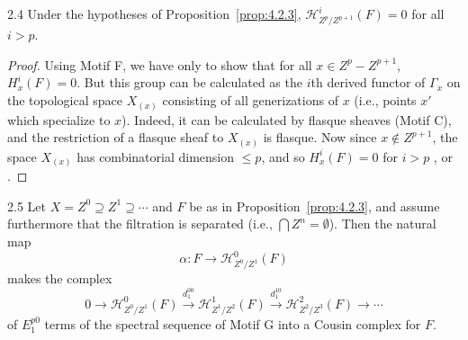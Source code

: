 \begin{booklemma}{2.4}\label{lem:4.2.4}
Under the hypotheses of Proposition~\ref{prop:4.2.3}, $\mathcal{H}_{Z^{p}/Z^{p+1}}^{i}(F)=0$ for all $i>p$.
\end{booklemma}

\begin{proof}
Using Motif F, we have only to show that for all $x\in Z^p-Z^{p+1}$, $H_x^{i}(F)=0$. But this group can be calculated as the $i$th derived functor of $\Gamma_x$ on the topological space $X_{(x)}$ consisting of all generizations of $x$ (i.e., points $x'$ which specialize to $x$). Indeed, it can be calculated by flasque sheaves (Motif C), and the restriction of a flasque sheaf to $X_{(x)}$ is flasque. Now since $x\notin Z^{p+1}$, the space $X_{(x)}$ has combinatorial dimension $\leq p$, and so $H_x^{i}(F)=0$ for $i>p$ \cite[\nopp II,~4.15.2]{G}, or \cite[]{LC}.
\end{proof}

\begin{bookproposition}{2.5}\label{prop:4.2.5}
Let $X=Z^0\supseteq Z^1\supseteq\cdots$ and $F$ be as in Proposition~\ref{prop:4.2.3}, and assume furthermore that the filtration is separated (i.e., $\bigcap Z^n=\emptyset$). Then the natural map
\[
\alpha\colon F\longrightarrow \mathcal{H}_{Z^{0}/Z^{1}}^{0}(F)
\]
makes the complex
\[
0\longrightarrow \mathcal{H}_{Z^{0}/Z^{1}}^{0}(F)\xrightarrow{d_1^{00}} \mathcal{H}_{Z^{1}/Z^{2}}^{1}(F)\xrightarrow{d_1^{10}} \mathcal{H}_{Z^{2}/Z^{3}}^{2}(F)\longrightarrow\cdots
\]
of $E_1^{p0}$ terms of the spectral sequence of Motif G into a Cousin complex for $F$.
\end{bookproposition}

